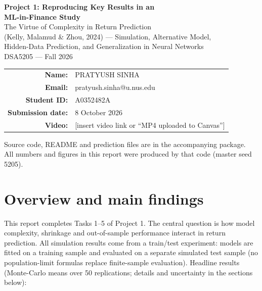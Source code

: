 \documentclass[11pt,a4paper]{article}
\makeatletter
\newcommand{\StudentName}{PRATYUSH SINHA}
\newcommand{\StudentEmail}{pratyush.sinha@u.nus.edu}
\newcommand{\StudentID}{A0352482A}
\newcommand{\VideoLink}{[insert video link or ``MP4 uploaded to Canvas'']}
\makeatother
\begin{document}
\begin{titlepage}
\centering
\vspace*{3cm}
{\LARGE\bfseries Project 1: Reproducing Key Results in an\\[4pt] ML-in-Finance Study}\\[1.2cm]
{\Large The Virtue of Complexity in Return Prediction\\[4pt]
(Kelly, Malamud \& Zhou, 2024) --- Simulation, Alternative Model,\\
Hidden-Data Prediction, and Generalization in Neural Networks}\\[2cm]
{\large DSA5205 --- Fall 2026}\\[2cm]
\begin{tabular}{rl}
\textbf{Name:} & \StudentName\\
\textbf{Email:} & \StudentEmail\\
\textbf{Student ID:} & \StudentID\\
\textbf{Submission date:} & 8 October 2026\\
\textbf{Video:} & \VideoLink
\end{tabular}
\vfill
{\small Source code, README and prediction files are in the accompanying package.\\
All numbers and figures in this report were produced by that code (master seed 5205).}
\end{titlepage}

\tableofcontents
\newpage

\section{Overview and main findings}
This report completes Tasks 1--5 of Project 1. The central question is how model complexity, shrinkage and
out-of-sample performance interact in return prediction. All simulation results come from a train/test
experiment: models are fitted on a training sample and evaluated on a separate simulated test sample
(no population-limit formulas replace finite-sample evaluation). Headline results (Monte-Carlo means over
50 replications; details and uncertainty in the sections below):
\end{document}
